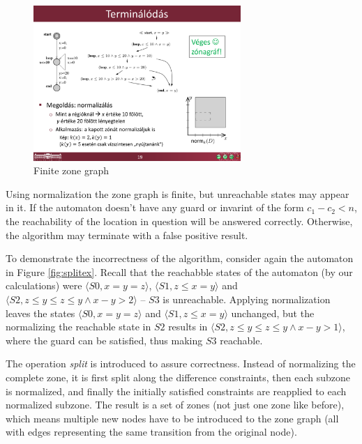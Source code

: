 
\begin{figure}
	\centering
	\includegraphics [width=0.7\textwidth] {include/figures/loop_real_zonegraph}%
	\caption{Finite zone graph}
	\label{fig:looprealgraph}
\end{figure}

Using normalization the zone graph is finite, but unreachable states may appear in it. If the automaton doesn't have any guard or invarint of the form $c_1 - c_2 < n$, the reachability of the location in question will be answered correctly. Otherwise, the algorithm may terminate with a false positive result.

	To demonstrate the incorrectness of the algorithm, consider again the automaton in Figure \ref{fig:splitex}. Recall that the reachabble states of the automaton (by our calculations) were $\langle S0,x=y=z \rangle$, $\langle S1,z \leq x=y \rangle$ and $\langle S2,z \leq y \leq z \leq y \wedge x-y > 2\rangle$ -- $S3$ is unreachable. Applying normalization leaves the states $\langle S0,x=y=z \rangle$ and $\langle S1,z \leq x=y \rangle$ unchanged, but the normalizing the reachable state in $S2$ results in $\langle S2,z \leq y \leq z \leq y \wedge x-y > 1\rangle$, where the guard can be satisfied, thus making $S3$ reachable.

The operation \emph{split} \cite{bengtsson2004timed} is introduced to assure correctness. Instead of
normalizing the complete zone, it is first split along the difference constraints,
then each subzone is normalized, and finally the initially satisfied constraints are reapplied to each normalized subzone. The result is a set of zones (not just one zone like before), which means multiple new nodes have to be introduced to the zone graph (all with edges representing the same transition from the original node).

